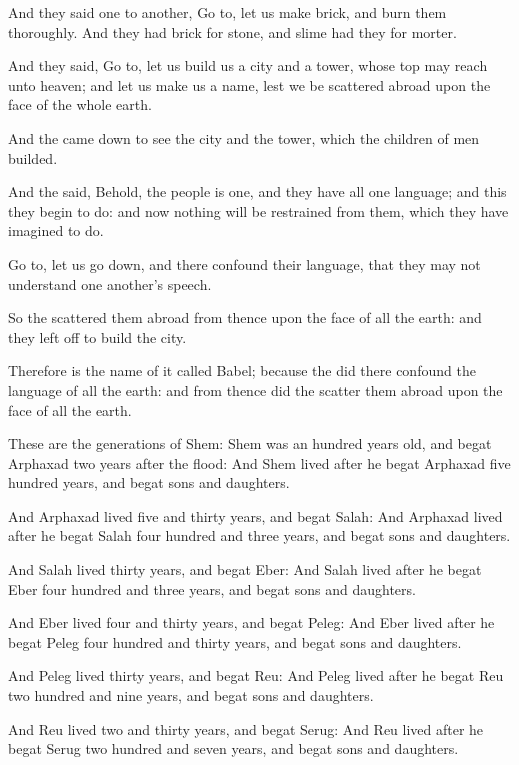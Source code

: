 \verse And they said one to another, Go to, let us make brick, and burn them thoroughly. And they had brick for stone, and slime had they for morter.

\verse And they said, Go to, let us build us a city and a tower, whose top may reach unto heaven; and let us make us a name, lest we be scattered abroad upon the face of the whole earth.

\verse And the \LORD came down to see the city and the tower, which the children of men builded.

\verse And the \LORD said, Behold, the people is one, and they have all one language; and this they begin to do: and now nothing will be restrained from them, which they have imagined to do.

\verse Go to, let us go down, and there confound their language, that they may not understand one another's speech.

\verse So the \LORD scattered them abroad from thence upon the face of all the earth: and they left off to build the city.

\verse Therefore is the name of it called Babel; because the \LORD did there confound the language of all the earth: and from thence did the \LORD scatter them abroad upon the face of all the earth.

\verse These are the generations of Shem: Shem was an hundred years old, and begat Arphaxad two years after the flood: \verse And Shem lived after he begat Arphaxad five hundred years, and begat sons and daughters.

\verse And Arphaxad lived five and thirty years, and begat Salah: \verse And Arphaxad lived after he begat Salah four hundred and three years, and begat sons and daughters.

\verse And Salah lived thirty years, and begat Eber: \verse And Salah lived after he begat Eber four hundred and three years, and begat sons and daughters.

\verse And Eber lived four and thirty years, and begat Peleg: \verse And Eber lived after he begat Peleg four hundred and thirty years, and begat sons and daughters.

\verse And Peleg lived thirty years, and begat Reu: \verse And Peleg lived after he begat Reu two hundred and nine years, and begat sons and daughters.

\verse And Reu lived two and thirty years, and begat Serug: \verse And Reu lived after he begat Serug two hundred and seven years, and begat sons and daughters.

